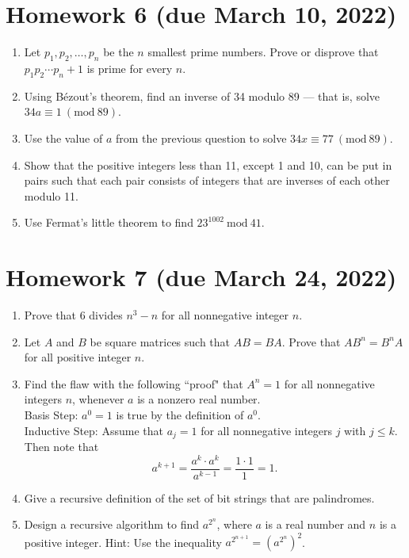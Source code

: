 \documentclass[11pt]{article}
\newcommand{\PMod}[1]{\ (\mathrm{mod}\ #1)}
\newcommand{\Mod}[1]{\ \mathrm{mod}\ #1}\usepackage{parskip} %
\begin{document}
\section*{Homework 6 (due March 10, 2022)}

\begin{enumerate}
    \item Let $p_1, p_2, \ldots, p_n$ be the $n$ smallest prime numbers. Prove or disprove that $p_1p_2 \cdots p_n + 1$ is prime for every $n$.
    \item Using B\'{e}zout's theorem, find an inverse of 34 modulo 89 --- that is, solve $34a \equiv 1 \PMod{89}$.
    \item Use the value of $a$ from the previous question to solve $34x \equiv 77 \PMod{89}$.
    \item Show that the positive integers less than 11, except 1 and 10, can be put in pairs such that each pair consists of integers that are inverses of each other modulo 11.
    \item Use Fermat's little theorem to find $23^{1002} \Mod{41}$.
\end{enumerate}

\section*{Homework 7 (due March 24, 2022)}

\begin{enumerate}
    \item Prove that 6 divides $n^3 - n$ for all nonnegative integer $n$.
    \item Let $A$ and $B$ be square matrices such that $AB = BA$. Prove that $AB^n = B^nA$ for all positive integer $n$.
    \item Find the flaw with the following ``proof" that $A^n = 1$ for all nonnegative integers $n$, whenever $a$ is a nonzero real number.\\
    Basis Step: $a^0 = 1$ is true by the definition of $a^0$.\\
    Inductive Step: Assume that $a_j = 1$ for all nonnegative integers $j$ with $j \leq k$. Then note that
    \[a^{k+1} = \frac{a^k \cdot a^k}{a^{k-1}} = \frac{1 \cdot 1}{1} = 1.\]
    \item Give a recursive definition of the set of bit strings that are palindromes.
    \item Design a recursive algorithm to find $a^{2^n}$, where $a$ is a real number and $n$ is a positive integer. Hint: Use the inequality $a^{2^{n+1}} = (a^{2^n})^2$.
\end{enumerate}
\end{document}

